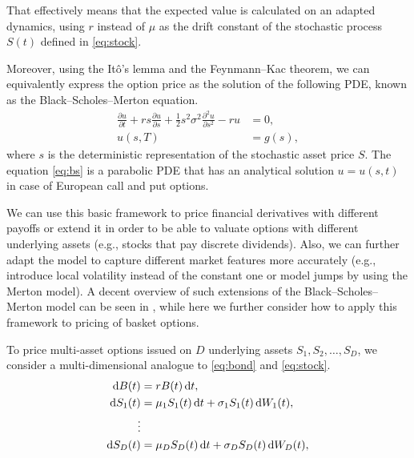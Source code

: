 \documentclass{UUThesisTemplate}
\begin{document}
That effectively means that the expected value is calculated on an adapted dynamics, using $r$ instead of $\mu$ as the drift constant of the stochastic process $S(t)$ defined in \eqref{eq:stock}. 
\par Moreover, using the It\^o's lemma and the Feynmann--Kac theorem, we can equivalently express the option price as the solution of the following PDE, known as the Black--Scholes--Merton equation.
\begin{align}
\frac{\partial u}{\partial t} + r s \frac{\partial u} {\partial s} + \frac{1}{2} s^2 \sigma^2 \frac{\partial^2 u}{\partial s^2} - r u &= 0, \nonumber \\
u(s,T) &= g(s), \label{eq:bs}
\end{align}
where $s$ is the deterministic representation of the stochastic asset price $S$. The equation \eqref{eq:bs} is a parabolic PDE that has an analytical solution $u=u(s,t)$ in case of European call and put options. %
\par We can use this basic framework to price financial derivatives with different payoffs or extend it in order to be able to valuate options with different underlying assets (e.g., stocks that pay discrete dividends). Also, we can further adapt the model to capture different market features more accurately (e.g., introduce local volatility instead of the constant one or model jumps by using the Merton model). A decent overview of such extensions of the Black--Scholes--Merton model can be seen in \cite{paper2}, while here we further consider how to apply this framework to pricing of basket options.
\par To price multi-asset options issued on $D$ underlying assets $S_1,S_2,\ldots,S_D$, we consider a multi-dimensional analogue to \eqref{eq:bond} and \eqref{eq:stock}.
\begin{align}
\dif B(t)&=rB(t)\dif t, \nonumber \\
\dif S_1(t)&=\mu_1 S_1(t)\dif t+\sigma_1 S_1(t)\dif W_1(t), \nonumber \\
\vdots \nonumber \\ 
\dif S_D(t)&=\mu_D S_D(t)\dif t+\sigma_D S_D(t)\dif W_D(t), \label{eq:multi}
\end{align}
\end{document}
